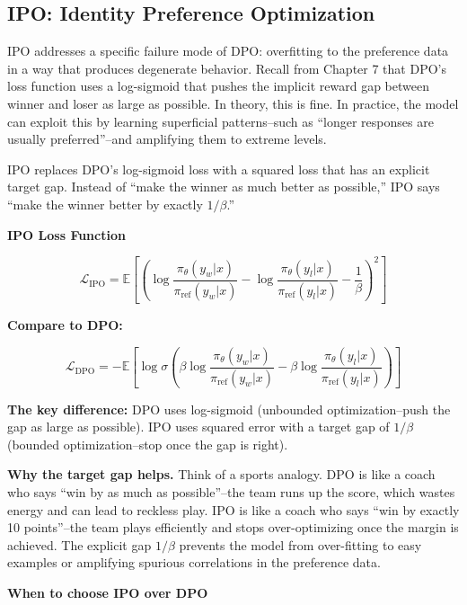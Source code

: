 \begin{chapterenv}
\section{IPO: Identity Preference Optimization}

IPO addresses a specific failure mode of DPO: overfitting to the preference data in a way that produces degenerate behavior. Recall from Chapter 7 that DPO's loss function uses a log-sigmoid that pushes the implicit reward gap between winner and loser as large as possible. In theory, this is fine. In practice, the model can exploit this by learning superficial patterns--such as ``longer responses are usually preferred''--and amplifying them to extreme levels.

IPO replaces DPO's log-sigmoid loss with a squared loss that has an explicit target gap. Instead of ``make the winner as much better as possible,'' IPO says ``make the winner better by exactly $1/\beta$.''

\begin{infobox}
\textbf{IPO Loss Function}

$$\mathcal{L}_{\text{IPO}} = \mathbb{E}\!\left[\left(\log \frac{\pi_\theta(y_w|x)}{\pi_{\text{ref}}(y_w|x)} - \log \frac{\pi_\theta(y_l|x)}{\pi_{\text{ref}}(y_l|x)} - \frac{1}{\beta}\right)^{\!2}\right]$$

\textbf{Compare to DPO:}

$$\mathcal{L}_{\text{DPO}} = -\mathbb{E}\!\left[\log \sigma\!\left(\beta \log \frac{\pi_\theta(y_w|x)}{\pi_{\text{ref}}(y_w|x)} - \beta \log \frac{\pi_\theta(y_l|x)}{\pi_{\text{ref}}(y_l|x)}\right)\right]$$

\textbf{The key difference:} DPO uses log-sigmoid (unbounded optimization--push the gap as large as possible). IPO uses squared error with a target gap of $1/\beta$ (bounded optimization--stop once the gap is right).
\end{infobox}

\textbf{Why the target gap helps.} Think of a sports analogy. DPO is like a coach who says ``win by as much as possible''--the team runs up the score, which wastes energy and can lead to reckless play. IPO is like a coach who says ``win by exactly 10 points''--the team plays efficiently and stops over-optimizing once the margin is achieved. The explicit gap $1/\beta$ prevents the model from over-fitting to easy examples or amplifying spurious correlations in the preference data.

\begin{tipbox}
\textbf{When to choose IPO over DPO}


\end{tipbox}
\end{chapterenv}
